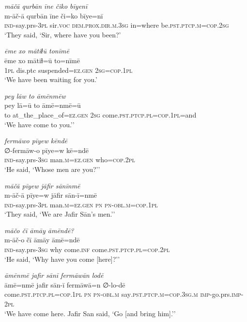 \ea \label{ŠJ.30}
\textit{māčā qurbān īne čiko bīyenī} \\ 
\gll m-āč-ā qurbān īne či=ko bīye=nī \\ 
 \textsc{ind-}say.prs\textsc{-3pl} sir.\textsc{voc} \textsc{dem.prox}\textsc{.dir}\textsc{.m}\textsc{.3sg} in=where be\textsc{.pst}\textsc{.ptcp}\textsc{.m}\textsc{=cop}\textsc{.\textsc{2sg}} \\ 
\glt `They said, ‘Sir, where have you been?'
\z 
 
\ea \label{ŠJ.31}
\textit{ēme xo mātiɫū tonīmē} \\ 
\gll ēme xo mātiɫ=ū to=nīmē \\ 
 \textsc{1pl} dis.ptc suspended\textsc{=ez.gen} \textsc{2sg}\textsc{=cop}\textsc{.\textsc{1pl}} \\ 
\glt `We have been waiting for you.'
\z 
 
\ea \label{ŠJ.32}
\textit{pey lāw to āmēnmēw} \\ 
\gll pey lā=ū to āmē=nmē=ū \\ 
 to at\_the\_place\_of\textsc{=ez.gen} \textsc{2sg} come\textsc{.pst}\textsc{.ptcp}\textsc{.pl}\textsc{=cop}\textsc{.\textsc{1pl}}=and \\ 
\glt `We have come to you.’'
\z 
 
\ea \label{ŠJ.33}
\textit{fermāwo pīyew kēndē} \\ 
\gll ∅-fermāw-o pīye=w kē=ndē \\ 
 \textsc{ind-}say.prs\textsc{-3sg} man\textsc{.m}\textsc{=ez.gen} who\textsc{=cop}.\textsc{2pl} \\ 
\glt `He said, ‘Whose men are you?’'
\z 
 
\ea \label{ŠJ.34}
\textit{māčā pīyew jāfir sānīnmē} \\ 
\gll m-āč-ā pīye=w jāfir sān-ī=nmē \\ 
 \textsc{ind-}say.prs\textsc{-3pl} man\textsc{.m}\textsc{=ez.gen} \textsc{pn} \textsc{pn}\textsc{-obl}\textsc{.m}\textsc{=cop}\textsc{.\textsc{1pl}} \\ 
\glt `They said, ‘We are Jafir Sān’s men.’'
\z 
 
\ea \label{ŠJ.35}
\textit{māčo čī āmāy āmēndē?} \\ 
\gll m-āč-o čī āmāy āmē=ndē \\ 
 \textsc{ind-}say.prs\textsc{-3sg} why come\textsc{.inf} come\textsc{.pst}\textsc{.ptcp}\textsc{.pl}\textsc{=cop}.\textsc{2pl} \\ 
\glt `He said, ‘Why have you come [here]?’'
\z 
 
\ea \label{ŠJ.36}
\textit{āmēnmē jafir sānī fermāwān lodē} \\ 
\gll āmē=nmē jafir sān-ī fermāwā=n ∅-lo-dē \\ 
 come\textsc{.pst}\textsc{.ptcp}\textsc{.pl}\textsc{=cop}\textsc{.\textsc{1pl}} \textsc{pn} \textsc{pn}\textsc{-obl}\textsc{.m} say\textsc{.pst}\textsc{.ptcp}\textsc{.m}\textsc{=cop}\textsc{.3sg}\textsc{.m} \textsc{imp-}go.prs.\textsc{imp-}\textsc{2pl} \\ 
\glt `We have come here. Jafir San said, ‘Go [and bring him].’'
\z 
 
